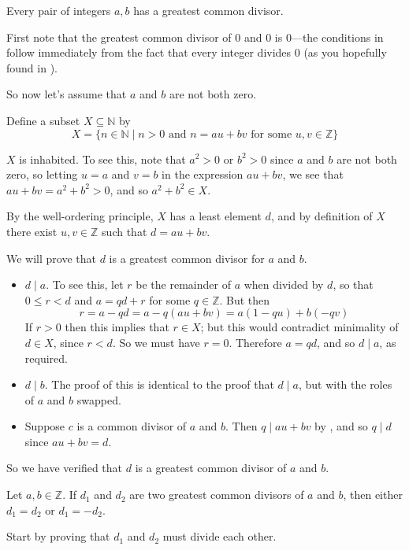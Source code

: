 \begin{theorem}
\label{thmGCDsExist}
Every pair of integers $a,b$ has a greatest common divisor.
\end{theorem}
\begin{cproof}
First note that the greatest common divisor of $0$ and $0$ is $0$---the conditions in  follow immediately from the fact that every integer divides $0$ (as you hopefully found in ).

So now let's assume that $a$ and $b$ are not both zero.

Define a subset $X \subseteq \mathbb{N}$ by
\[ X = \{ n \in \mathbb{N} \mid n > 0 \text{ and } n = au+bv \text{ for some } u,v \in \mathbb{Z} \} \]

$X$ is inhabited. To see this, note that $a^2 > 0$ or $b^2 > 0$ since $a$ and $b$ are not both zero, so letting $u=a$ and $v=b$ in the expression $au+bv$, we see that $au+bv=a^2+b^2>0$, and so $a^2+b^2 \in X$.

By the well-ordering principle, $X$ has a least element $d$, and by definition of $X$ there exist $u,v \in \mathbb{Z}$ such that $d = au+bv$.

We will prove that $d$ is a greatest common divisor for $a$ and $b$.
\begin{itemize}
\item $d \mid a$. To see this, let $r$ be the remainder of $a$ when divided by $d$, so that $0 \le r < d$ and $a=qd+r$ for some $q \in \mathbb{Z}$. But then
\[ r = a-qd = a-q(au+bv) = a(1-qu) + b(-qv) \]
If $r>0$ then this implies that $r \in X$; but this would contradict minimality of $d \in X$, since $r < d$. So we must have $r=0$. Therefore $a = qd$, and so $d \mid a$, as required.
\item $d \mid b$. The proof of this is identical to the proof that $d \mid a$, but with the roles of $a$ and $b$ swapped.
\item Suppose $c$ is a common divisor of $a$ and $b$. Then $q \mid au+bv$ by , and so $q \mid d$ since $au+bv=d$.
\end{itemize}
So we have verified that $d$ is a greatest common divisor of $a$ and $b$.
\end{cproof}

\begin{exercise}
\label{exGCDUnique}
Let $a,b \in \mathbb{Z}$. If $d_1$ and $d_2$ are two greatest common divisors of $a$ and $b$, then either $d_1=d_2$ or $d_1=-d_2$.
\begin{backhint}
Start by proving that $d_1$ and $d_2$ must divide each other.
\end{backhint}
\end{exercise}

